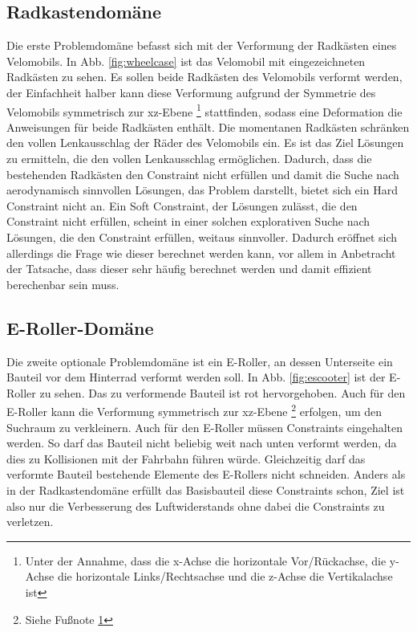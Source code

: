 \documentclass[12pt]{article}
\begin{document}
\subsection{Radkastendomäne}

Die erste Problemdomäne befasst sich mit der Verformung der Radkästen eines Velomobils.
In Abb. \ref{fig:wheelcase} ist das Velomobil mit eingezeichneten Radkästen zu sehen.
Es sollen beide Radkästen des Velomobils verformt werden, der Einfachheit halber kann diese Verformung aufgrund der Symmetrie des Velomobils symmetrisch zur xz-Ebene
\footnote{\label{foot:coords} Unter der Annahme, dass die x-Achse die horizontale Vor/Rückachse, die y-Achse die horizontale Links/Rechtsachse und die z-Achse die Vertikalachse ist} stattfinden, sodass eine Deformation die Anweisungen für beide Radkästen enthält.
Die momentanen Radkästen schränken den vollen Lenkausschlag der Räder des Velomobils ein.
Es ist das Ziel Lösungen zu ermitteln, die den vollen Lenkausschlag ermöglichen.
Dadurch, dass die bestehenden Radkästen den Constraint nicht erfüllen und damit die Suche nach aerodynamisch sinnvollen Lösungen, das Problem darstellt, bietet sich ein Hard Constraint nicht an.
Ein Soft Constraint, der Lösungen zulässt, die den Constraint nicht erfüllen, scheint in einer solchen explorativen Suche nach Lösungen, die den Constraint erfüllen, weitaus sinnvoller.
Dadurch eröffnet sich allerdings die Frage wie dieser berechnet werden kann, vor allem in Anbetracht der Tatsache, dass dieser sehr häufig berechnet werden und damit effizient berechenbar sein muss.

\subsection{E-Roller-Domäne}

Die zweite optionale Problemdomäne ist ein E-Roller, an dessen Unterseite ein Bauteil vor dem Hinterrad verformt werden soll.
In Abb. \ref{fig:escooter} ist der E-Roller zu sehen. Das zu verformende Bauteil ist rot hervorgehoben.
Auch für den E-Roller kann die Verformung symmetrisch zur xz-Ebene \footnote{Siehe Fußnote \ref{foot:coords}} erfolgen, um den Suchraum zu verkleinern.
Auch für den E-Roller müssen Constraints eingehalten werden.
So darf das Bauteil nicht beliebig weit nach unten verformt werden, da dies zu Kollisionen mit der Fahrbahn führen würde.
Gleichzeitig darf das verformte Bauteil bestehende Elemente des E-Rollers nicht schneiden.
Anders als in der Radkastendomäne erfüllt das Basisbauteil diese Constraints schon, Ziel ist also nur die Verbesserung des Luftwiderstands ohne dabei die Constraints zu verletzen.
 
\end{document}
